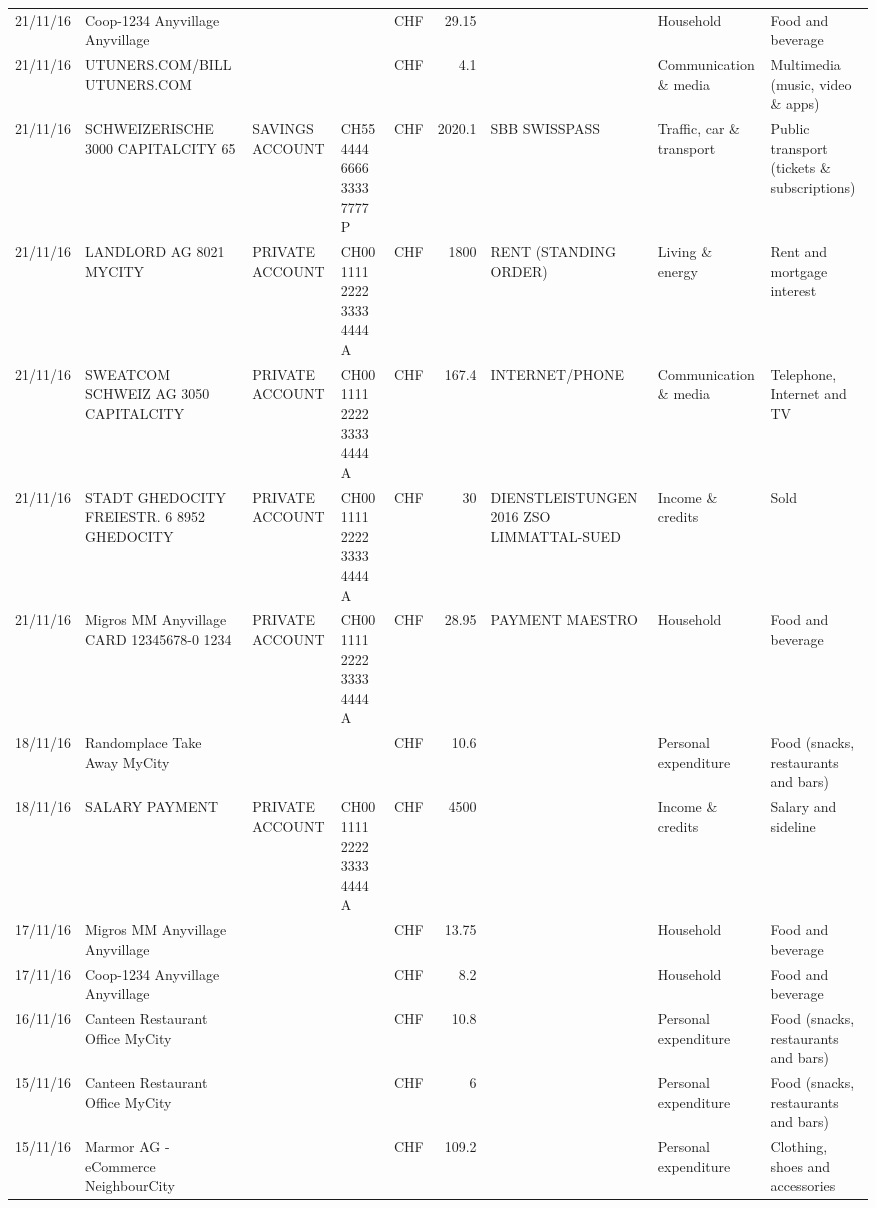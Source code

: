 \begin{landscape}
\begin{table}[h]
\begin{center}
\begin{tabular}{rllllrlll}
		21/11/16 & Coop-1234 Anyvillage    Anyvillage &       &       & CHF   & 29.15 &       & Household & Food and beverage \\
		21/11/16 & UTUNERS.COM/BILL          UTUNERS.COM &       &       & CHF   & 4.1   &       & Communication \& media & Multimedia (music, video \& apps) \\
		21/11/16 & SCHWEIZERISCHE 3000 CAPITALCITY 65 & SAVINGS ACCOUNT & CH55 4444 6666 3333 7777 P & CHF   & 2020.1 & SBB SWISSPASS & Traffic, car \& transport & Public transport (tickets \& subscriptions) \\
		21/11/16 & LANDLORD AG 8021 MYCITY & PRIVATE ACCOUNT & CH00 1111 2222 3333 4444 A & CHF   & 1800  & RENT (STANDING ORDER) & Living \& energy & Rent and mortgage interest \\
		21/11/16 & SWEATCOM SCHWEIZ AG 3050 CAPITALCITY & PRIVATE ACCOUNT & CH00 1111 2222 3333 4444 A & CHF   & 167.4 & INTERNET/PHONE & Communication \& media & Telephone,  Internet and TV \\
		21/11/16 & STADT GHEDOCITY FREIESTR. 6 8952 GHEDOCITY & PRIVATE ACCOUNT & CH00 1111 2222 3333 4444 A & CHF   & 30    & DIENSTLEISTUNGEN 2016      ZSO LIMMATTAL-SUED & Income \& credits & Sold \\
		21/11/16 & Migros MM Anyvillage CARD 12345678-0 1234 & PRIVATE ACCOUNT & CH00 1111 2222 3333 4444 A & CHF   & 28.95 & PAYMENT MAESTRO & Household & Food and beverage \\
		18/11/16 & Randomplace Take Away     MyCity &       &       & CHF   & 10.6  &       & Personal expenditure & Food (snacks, restaurants and bars) \\
		18/11/16 & SALARY PAYMENT & PRIVATE ACCOUNT & CH00 1111 2222 3333 4444 A & CHF   & 4500  &       & Income \& credits & Salary and sideline \\
		17/11/16 & Migros MM Anyvillage    Anyvillage &       &       & CHF   & 13.75 &       & Household & Food and beverage \\
		17/11/16 & Coop-1234 Anyvillage    Anyvillage &       &       & CHF   & 8.2   &       & Household & Food and beverage \\
		16/11/16 & Canteen Restaurant Office      MyCity &       &       & CHF   & 10.8  &       & Personal expenditure & Food (snacks, restaurants and bars) \\
		15/11/16 & Canteen Restaurant Office      MyCity &       &       & CHF   & 6     &       & Personal expenditure & Food (snacks, restaurants and bars) \\
		15/11/16 & Marmor AG - eCommerce     NeighbourCity &       &       & CHF   & 109.2 &       & Personal expenditure & Clothing, shoes and accessories \\

\end{tabular}
\end{center}
\end{table}
\end{landscape}
